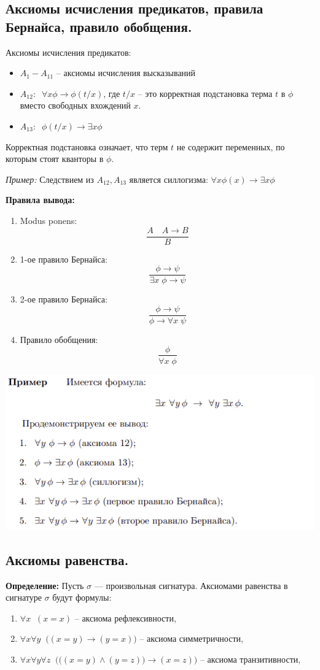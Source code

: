 \subsection{Аксиомы исчисления предикатов, правила Бернайса, правило обобщения.}
Аксиомы исчисления предикатов:
\begin{itemize}
    \item $A_1-A_{11}$ -- аксиомы исчисления высказываний
    \item $A_{12}: \;\; \forall x \phi \to \phi(t/x)$,  где $t/x$ -- это корректная подстановка терма $t$ в $\phi$ вместо свободных вхождений $x$. 
    \item $A_{13}: \;\; \phi(t/x) \to \exists x \phi$
\end{itemize}
Корректная подстановка означает, что терм $t$ не содержит переменных, по которым стоят кванторы в $\phi$.

\textit{Пример:} Следствием из $A_{12},A_{13}$ является силлогизма: $\forall x \phi(x) \to \exists x \phi$

\textbf{Правила вывода:}
\begin{enumerate}
    \item Modus ponens: $$\frac{A\quad A\to B}{B}$$
    \item 1-ое правило Бернайса: $$\frac{\phi\to\psi}{\exists x \; \phi\to\psi}$$
    \item 2-ое правило Бернайса: $$\frac{\phi\to\psi}{ \phi\to\forall x \;\psi}$$
    \item Правило обобщения: $$\frac{\phi}{\forall x \;\phi}$$
\end{enumerate}

\includegraphics[width=0.7\linewidth]{images/1_definitions_sillog.png}

\subsection{Аксиомы равенства.}
\textbf{Определение:} Пусть $\sigma$ — произвольная сигнатура. Аксиомами равенства в сигнатуре $\sigma$ будут формулы:
\begin{enumerate}
    \item $\forall x \;\; (x=x)$ -- аксиома рефлексивности,
    \item $\forall x \forall y \;\;  \big((x=y)\to(y=x)\big)$ -- аксиома симметричности,
    \item $\forall x \forall y \forall z\;\;  \big(\big((x=y)\land(y=z)\big)\to(x=z)\big)$ -- аксиома транзитивности,
\end{enumerate}

